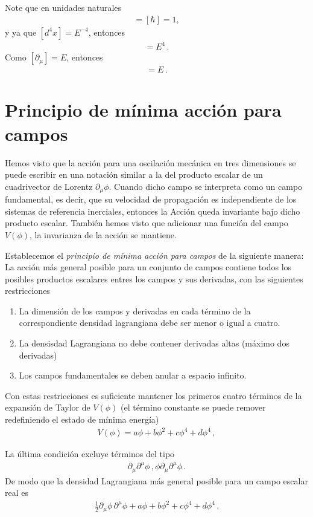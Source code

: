 Note que en unidades naturales
\begin{align}
  [S]=[\hbar]=1,
\end{align}
y ya que $[d^4x]=E^{-4}$, entonces
\begin{align}
  [\mathcal{L}]=E^{4}\,.
\end{align}
Como $[\partial_{\mu}]=E$, entonces
\begin{align}
  [\phi]=E\,.
\end{align}

\section{Principio de mínima acción para campos}
Hemos visto que la acción para una oscilación mecánica en tres dimensiones se puede escribir en una notación similar a la del producto escalar de un cuadrivector de Lorentz $\partial_\mu\phi$. Cuando dicho campo se interpreta como un campo fundamental, es decir, que su velocidad de propagación es independiente de los sistemas de referencia inerciales, entonces la Acción queda invariante bajo dicho producto escalar. También hemos visto que adicionar una función del campo $V(\phi)$, la invarianza de la acción se mantiene.

Establecemos el \emph{principio de mínima acción para campos} de la siguiente manera: La acción más general posible para un conjunto de campos contiene todos los posibles productos escalares entres los campos y sus derivadas, con las siguientes restricciones
\begin{enumerate}
\item La dimensión de los campos y derivadas en cada término de la correspondiente densidad lagrangiana debe ser menor o igual a cuatro.
\item La densisdad Lagrangiana no debe contener derivadas altas (máximo dos derivadas)
\item Los campos fundamentales se deben anular a espacio infinito.
\end{enumerate}
Con estas restricciones es suficiente mantener los primeros cuatro términos de la expansión de Taylor de $V(\phi)$ (el término constante se puede remover redefiniendo el estado de mínima energía)
\begin{align}
  V(\phi)=a \phi + b\phi^2+c\phi^4+d\phi^4\,,
\end{align}

La última condición excluye términos del tipo
\begin{align}
  \partial_\mu \partial^\mu \phi\,,   \phi\partial_\mu \partial^\mu \phi\,.
\end{align}
De modo que la densidad Lagrangiana más general posible para un campo escalar real es
\begin{align}
  \frac{1}{2}{\partial_\mu\phi}\,{\partial^\mu\phi}+a \phi + b\phi^2+c\phi^4+d\phi^4\,.
\end{align}

